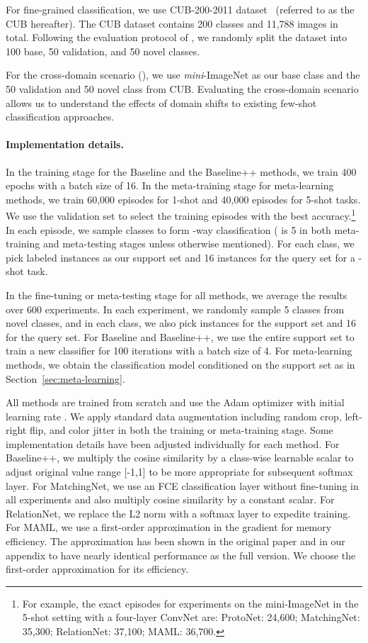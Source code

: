 \documentclass{article}
\newlength\paramargin
\newcommand{\secref}[1]{Section~\ref{sec:#1}}
\def \miniI {\emph{mini}-ImageNet }
\begin{document}
For fine-grained classification, we use CUB-200-2011 dataset~\cite{wah2011caltech} (referred to as the CUB hereafter). The CUB dataset contains 200 classes and 11,788 images in total. Following the evaluation protocol of \cite{hilliard2018few}, we randomly split the dataset into 100 base, 50 validation, and 50 novel classes. 

For the cross-domain scenario (\miniICUB), we use \miniI as our base class and the 50 validation and 50 novel class from CUB. Evaluating the cross-domain scenario allows us to understand the effects of domain shifts to existing few-shot classification approaches.


\vspace{\paramargin}
\paragraph{Implementation details.} In the training stage for the Baseline and the Baseline++ methods, we train 400 epochs with a batch size of 16. In the meta-training stage for meta-learning methods, we train 60,000 episodes for 1-shot and 40,000 episodes for 5-shot tasks. We use the validation set to select the training episodes with the best accuracy.\footnote{For example, the exact episodes for experiments on the mini-ImageNet in the 5-shot setting with a four-layer ConvNet are: ProtoNet: 24,600; MatchingNet: 35,300; RelationNet: 37,100; MAML: 36,700.}  In each episode, we sample  classes to form -way classification ( is 5 in both meta-training and meta-testing stages unless otherwise mentioned). For each class, we pick  labeled instances as our support set and 16 instances for the query set for a -shot task.

In the fine-tuning or meta-testing stage for all methods, we average the results over 600 experiments. In each experiment, we randomly sample 5 classes from novel classes, and in each class, we also pick  instances for the support set and 16 for the query set. For Baseline and Baseline++, we use the entire support set to train a new classifier for 100 iterations with a batch size of 4. For meta-learning methods, we obtain the classification model conditioned on the support set as in \secref{meta-learning}.

All methods are trained from scratch and use the Adam optimizer with initial learning rate . We apply standard data augmentation including random crop, left-right flip, and color jitter in both the training or meta-training stage. Some implementation details have been adjusted individually for each method. 
For Baseline++, we multiply the cosine similarity by a class-wise learnable scalar to adjust original value range [-1,1] to be more appropriate for subsequent softmax layer.
For MatchingNet, we use an FCE classification layer without fine-tuning in all experiments and also multiply cosine similarity by a constant scalar.
For RelationNet, we replace the L2 norm with a softmax layer to expedite training. 
For MAML, we use a first-order approximation in the gradient for memory efficiency. 
The approximation has been shown in the original paper and in our appendix to have nearly identical  performance as the full version. We choose the first-order approximation for its efficiency. 
\end{document}
